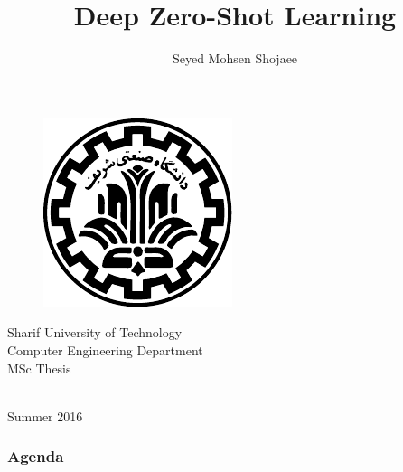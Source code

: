 \documentclass{beamer}
\begin{document}
\title{Deep Zero-Shot Learning}
\author{Seyed Mohsen Shojaee}
\date{}

\begin{frame}
  \begin{center}
\begin{figure}
\includegraphics[scale=0.5]{../images/logo.pdf}
\end{figure}
{\footnotesize Sharif University of Technology \\ Computer Engineering Department \\ MSc Thesis}
\maketitle
\vspace{-10mm}{\footnotesize supervised by \\ Dr.Mahdieh Soleymani} \\
\vspace{4mm}
Summer 2016
\end{center}
\end{frame}



\begin{frame}
  \frametitle{Agenda}
  \tableofcontents
\end{frame}
\end{document}
